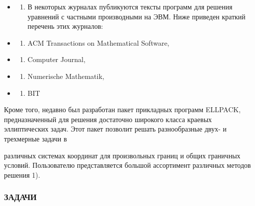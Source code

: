 \documentclass[
  ukrainian,
]{article}
\providecommand{\tightlist}{%
  \setlength{\itemsep}{0pt}\setlength{\parskip}{0pt}}
\begin{document}
\begin{itemize}
\tightlist
\item
  \begin{enumerate}
  \def\labelenumi{\arabic{enumi}.}
  \setcounter{enumi}{6}
  \tightlist
  \item
    В некоторых журналах публикуются тексты программ для решения
    уравнений с частными производными на ЭВМ. Ниже приведен краткий
    перечень этих журналов:
  \end{enumerate}
\item
  \begin{enumerate}
  \def\labelenumi{\alph{enumi})}
  \tightlist
  \item
    ACM Transactions on Mathematical Software,
  \end{enumerate}
\item
  \begin{enumerate}
  \def\labelenumi{\arabic{enumi})}
  \setcounter{enumi}{5}
  \tightlist
  \item
    Computer Journal,
  \end{enumerate}
\item
  \begin{enumerate}
  \def\labelenumi{\Alph{enumi})}
  \setcounter{enumi}{1}
  \tightlist
  \item
    Numerische Mathematik,
  \end{enumerate}
\item
  \begin{enumerate}
  \def\labelenumi{\alph{enumi})}
  \setcounter{enumi}{17}
  \tightlist
  \item
    BIT
  \end{enumerate}
\end{itemize}

Кроме того, недавно был разработан пакет прикладных программ ELLPACK,
предназначенный для решения достаточно широкого класса краевых
эллиптических задач. Этот пакет позволит решать разнообразные двух- и
трехмерные задачи в

различных системах координат для произвольных границ и общих граничных
условий. Пользователю представляется большой ассортимент различных
методов решения 1).

\subsubsection{ЗАДАЧИ}\label{ux437ux430ux434ux430ux447ux438-15}
\end{document}
